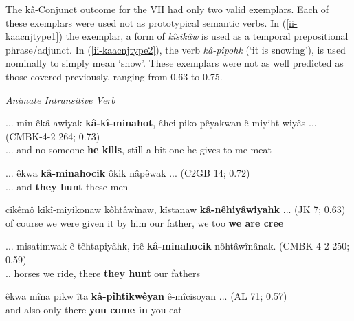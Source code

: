 The kâ-Conjunct outcome for the VII had only two valid exemplars. Each of these exemplars were used not as prototypical semantic verbs. In (\ref{ii-kaacnjtype1}) the exemplar, a form of \textit{kîsikâw} is used as a temporal prepositional phrase/adjunct. In (\ref{ii-kaacnjtype2}), the verb \textit{kâ-pipohk} (`it is snowing'), is used nominally to simply mean `snow'. These exemplars were not as well predicted as those covered previously, ranging from 0.63 to 0.75.
    
\vspace{5mm}
\textit{Animate Intransitive Verb}

    \begin{exe}
    \ex
    \gll ... mîn êkâ awiyak \textbf{kâ-kî-minahot}, âhci piko pêyakwan ê-miyiht wiyâs ... \tiny{(CMBK-4-2 264; 0.73)}  \\
    ... and no someone {\textbf{he kills}}, still {a bit} one {he gives to me} meat \\
    \trans  
    \label{ai-kaacnjtype1}
    \end{exe}
    
    
    \begin{exe}
    \ex
    \gll ... êkwa \textbf{kâ-minahocik} ôkik nâpêwak ... \tiny{(C2GB 14; 0.72)} \\
    ... and {\textbf{they hunt}} these men  \\
    \trans  
    \label{ai-kaacnjtype2}
    \end{exe}
    
    \begin{exe}
    \ex
    \gll cikêmô kikî-miyikonaw kôhtâwînaw, kîstanaw \textbf{kâ-nêhiyâwiyahk} ... \tiny{(JK 7; 0.63)}\\
    {of course} {we were given it by him} {our father}, {we too} {\textbf{we are cree}}  \\
    \trans 
    \label{ai-kaacnjtype3}
    \end{exe}
    
    \begin{exe}
    \ex
    \gll ... misatimwak ê-têhtapiyâhk, itê \textbf{kâ-minahocik} nôhtâwînânak. \tiny{(CMBK-4-2 250; 0.59)}\\
    .. horses {we ride}, there {\textbf{they hunt}} {our fathers}\\
    \trans 
    \label{ai-kaacnjtype4}
    \end{exe}
    
    \begin{exe}
    \ex
    \gll êkwa mîna pikw îta \textbf{kâ-pîhtikwêyan} ê-mîcisoyan ... \tiny{(AL 71; 0.57)}\\
     and also only there {\textbf{you come in}} {you eat}\\
    \trans 
    \label{ai-kaacnjtype5}
    \end{exe}

